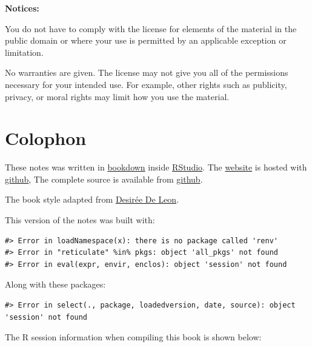 \textbf{Notices:}

You do not have to comply with the license for elements of the
material in the public domain or where your use is permitted by an
applicable exception or limitation.

No warranties are given. The license may not give you all of the
permissions necessary for your intended use. For example, other rights
such as publicity, privacy, or moral rights may limit how you use the
material.

\hypertarget{colophon}{%
\chapter*{Colophon}\label{colophon}}


These notes was written in \href{http://bookdown.org/}{bookdown} inside \href{http://www.rstudio.com/ide/}{RStudio}. The \href{https://smasongarrison.github.io/syllabi}{website} is hosted with \href{https://www.github.com}{github}, The complete source is available from \href{https://github.com/smasongarrison/syllabi}{github}.

The book style adapted from \href{https://desiree.rbind.io/}{Desirée De Leon}.

This version of the notes was built with:

\begin{verbatim}
#> Error in loadNamespace(x): there is no package called 'renv'
#> Error in "reticulate" %in% pkgs: object 'all_pkgs' not found
#> Error in eval(expr, envir, enclos): object 'session' not found
\end{verbatim}

Along with these packages:

\begin{verbatim}
#> Error in select(., package, loadedversion, date, source): object 'session' not found
\end{verbatim}

The R session information when compiling this book is shown below:

